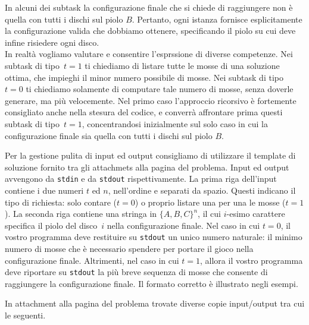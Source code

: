In alcuni dei subtask la configurazione finale che si chiede di raggiungere non è quella con tutti i dischi sul piolo $B$. Pertanto, ogni istanza fornisce esplicitamente la configurazione valida che dobbiamo ottenere, specificando il piolo su cui deve infine risiedere ogni disco.\\ 

In realtà vogliamo valutare e consentire l'esprssione di diverse competenze. Nei subtask di tipo~$t=1$ ti chiediamo di listare tutte le mosse di una soluzione ottima, che impieghi il minor numero possibile di mosse.
Nei subtask di tipo~$t=0$ ti chiediamo solamente di computare tale numero di mosse, senza doverle generare, ma più velocemente.
Nel primo caso l'approccio ricorsivo è fortemente consigliato anche nella stesura del codice, e converrà affrontare prima questi subtask di tipo~$t=1$, concentrandosi inizialmente sul solo caso in cui la configurazione finale sia quella con tutti i dischi sul piolo $B$.



Per la gestione pulita di input ed output consigliamo di utilizzare il template di soluzione fornito tra gli attachmets alla pagina del problema.
Input ed output avvengono da \verb'stdin'
e da \verb'stdout' rispettivamente.
La prima riga dell'input contiene i due numeri $t$ ed $n$, nell'ordine e separati da spazio. Questi indicano il tipo di richiesta: solo contare ($t=0$) o proprio listare una per una le mosse ($t=1$).
La seconda riga contiene una stringa in $\{A,B,C\}^n$, il cui $i$-esimo carattere specifica il piolo del disco~$i$ nella configurazione finale.
Nel caso in cui $t=0$, il vostro programma deve restituire su \verb'stdout' un unico numero naturale: il minimo numero di mosse che è necessario spendere per portare il gioco nella configurazione finale.
Altrimenti, nel caso in cui $t= 1$,
allora il vostro programma deve riportare su \verb'stdout'
la più breve sequenza di mosse che consente di raggiungere la configurazione finale. Il formato corretto è illustrato negli esempi. 



In attachment alla pagina del problema trovate diverse copie input/output tra cui le seguenti.


\vspace{0.5cm}


